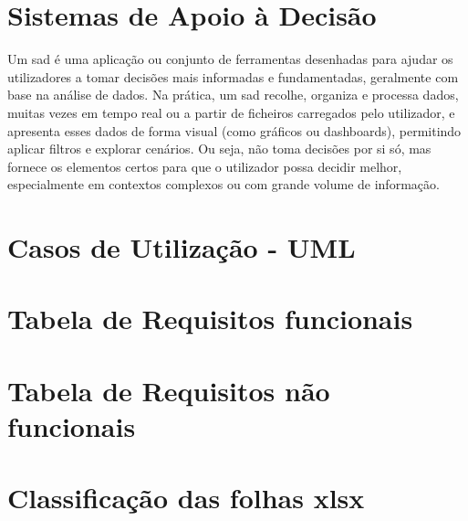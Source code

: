 



\chapter{Sistemas de Apoio à Decisão}
\label{ch:sad}

Um \gls{sad} é uma aplicação ou conjunto de ferramentas desenhadas para ajudar os utilizadores a tomar decisões mais informadas e fundamentadas, geralmente com base na análise de dados. Na prática, um \gls{sad} recolhe, organiza e processa dados, muitas vezes em tempo real ou a partir de ficheiros carregados pelo utilizador, e apresenta esses dados de forma visual (como gráficos ou dashboards), permitindo aplicar filtros e explorar cenários. Ou seja, não toma decisões por si só, mas fornece os elementos certos para que o utilizador possa decidir melhor, especialmente em contextos complexos ou com grande volume de informação.


\chapter{Casos de Utilização - UML}
\label{ch:casosUtilizacaoUml}

\chapter{Tabela de Requisitos funcionais}
\label{ch:outroDetalheAdicional}


\chapter{Tabela de Requisitos não funcionais}
\label{ch:outroDetalheAdicional}


\chapter{Classificação das folhas \gls{xlsx}}
\label{ch:outroDetalheAdicional}









